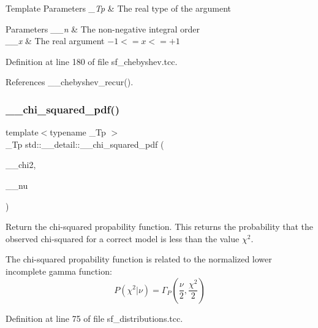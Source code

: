 \begin{DoxyTemplParams}{Template Parameters}
{\em \+\_\+\+Tp} & The real type of the argument \\
\hline
\end{DoxyTemplParams}

\begin{DoxyParams}{Parameters}
{\em \+\_\+\+\_\+n} & The non-\/negative integral order \\
\hline
{\em \+\_\+\+\_\+x} & The real argument $ -1 <= x <= +1 $ \\
\hline
\end{DoxyParams}


Definition at line 180 of file sf\+\_\+chebyshev.\+tcc.



References \+\_\+\+\_\+chebyshev\+\_\+recur().

\mbox{\label{namespacestd_1_1____detail_a2125cbbc3fd3aad11c8025478c7a14fe}} 
\subsubsection{\texorpdfstring{\+\_\+\+\_\+chi\+\_\+squared\+\_\+pdf()}{\_\_chi\_squared\_pdf()}}
{\footnotesize\ttfamily template$<$typename \+\_\+\+Tp $>$ \\
\+\_\+\+Tp std\+::\+\_\+\+\_\+detail\+::\+\_\+\+\_\+chi\+\_\+squared\+\_\+pdf (\begin{DoxyParamCaption}\item[{\+\_\+\+Tp}]{\+\_\+\+\_\+chi2,  }\item[{unsigned int}]{\+\_\+\+\_\+nu }\end{DoxyParamCaption})}



Return the chi-\/squared propability function. This returns the probability that the observed chi-\/squared for a correct model is less than the value $ \chi^2 $. 

The chi-\/squared propability function is related to the normalized lower incomplete gamma function\+: \[ P(\chi^2|\nu) = \Gamma_P(\frac{\nu}{2}, \frac{\chi^2}{2}) \] 

Definition at line 75 of file sf\+\_\+distributions.\+tcc.



